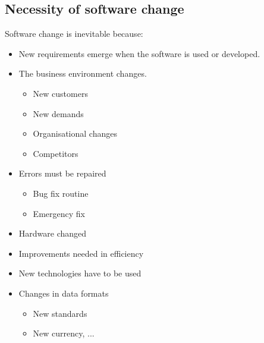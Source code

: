 \documentclass[a4paper,11pt]{report}
\begin{document}
	\subsection{Necessity of software change}
		Software change is inevitable because:
		\begin{itemize}
			\setlength{\itemsep}{0pt}		
			\setlength{\parskip}{0pt}		
			\setlength{\parsep}{0pt}	
			\item New requirements emerge when the 
				software is used or developed.
			\item The business environment changes.
				\begin{itemize}	
					\setlength{\itemsep}{0pt}		
					\setlength{\parskip}{0pt}		
					\setlength{\parsep}{0pt}	
					\item New customers
					\item New demands
					\item Organisational changes
					\item Competitors
				\end{itemize}
			\item Errors must be repaired
				\begin{itemize}
					\setlength{\itemsep}{0pt}		
					\setlength{\parskip}{0pt}		
					\setlength{\parsep}{0pt}	
					\item Bug fix routine
					\item Emergency fix
				\end{itemize}
			\item Hardware changed
			\item Improvements needed in efficiency
			\item New technologies have to be used
			\item Changes in data formats
				\begin{itemize}
					\setlength{\itemsep}{0pt}		
					\setlength{\parskip}{0pt}		
					\setlength{\parsep}{0pt}	
					\item New standards
					\item New currency, ...
				\end{itemize}
		\end{itemize}
\end{document}
